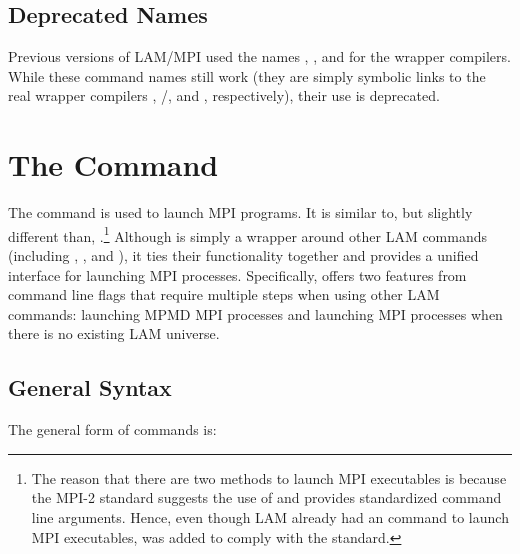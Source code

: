 

\subsection{Deprecated Names}

Previous versions of LAM/MPI used the names ,
, and  for the wrapper compilers.  While
these command names still work (they are simply symbolic links to the
real wrapper compilers , /, and
, respectively), their use is deprecated.


\section{The  Command}
\label{sec:commands-mpiexec}

The  command is used to launch MPI programs.  It is
similar to, but slightly different than, .\footnote{The
  reason that there are two methods to launch MPI executables is
  because the MPI-2 standard suggests the use of  and
  provides standardized command line arguments.  Hence, even though
  LAM already had an  command to launch MPI executables,
   was added to comply with the standard.}  Although
 is simply a wrapper around other LAM commands (including
, , and ), it ties their
functionality together and provides a unified interface for launching
MPI processes. 
%
Specifically,  offers two features from command line
flags that require multiple steps when using other LAM commands:
launching MPMD MPI processes and launching MPI processes when there is
no existing LAM universe.


\subsection{General Syntax}

The general form of  commands is:

